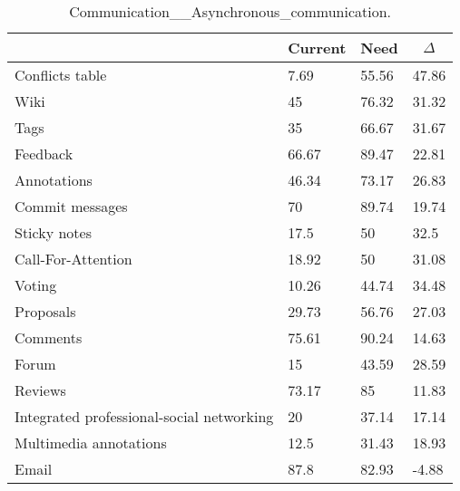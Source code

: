
  \begin{table*}[]
  \centering
  \notsotiny
  \caption{ Communication__Asynchronous_communication.}
\label{tab:communication__asynchronous_communication}
\begin{tabular}{|l|l|l|l|}
  \hline
  \rowcolor[HTML]{C0C0C0}
    \multicolumn{1}{|c|}{Feature} & \multicolumn{1}{c|}{Current} & \multicolumn{1}{c|}{Need} & \multicolumn{1}{c|}{$\Delta$} \\ \hline
  Conflicts table & 7.69 & 55.56 & 47.86 \\ \hline 
Wiki & 45 & 76.32 & 31.32 \\ \hline 
Tags & 35 & 66.67 & 31.67 \\ \hline 
Feedback & 66.67 & 89.47 & 22.81 \\ \hline 
Annotations & 46.34 & 73.17 & 26.83 \\ \hline 
Commit messages & 70 & 89.74 & 19.74 \\ \hline 
Sticky notes & 17.5 & 50 & 32.5 \\ \hline 
Call-For-Attention & 18.92 & 50 & 31.08 \\ \hline 
Voting & 10.26 & 44.74 & 34.48 \\ \hline 
Proposals & 29.73 & 56.76 & 27.03 \\ \hline 
Comments & 75.61 & 90.24 & 14.63 \\ \hline 
Forum & 15 & 43.59 & 28.59 \\ \hline 
Reviews & 73.17 & 85 & 11.83 \\ \hline 
Integrated professional-social networking & 20 & 37.14 & 17.14 \\ \hline 
Multimedia annotations & 12.5 & 31.43 & 18.93 \\ \hline 
Email & 87.8 & 82.93 & -4.88 \\ \hline 
\end{tabular}%
  \end{table*}